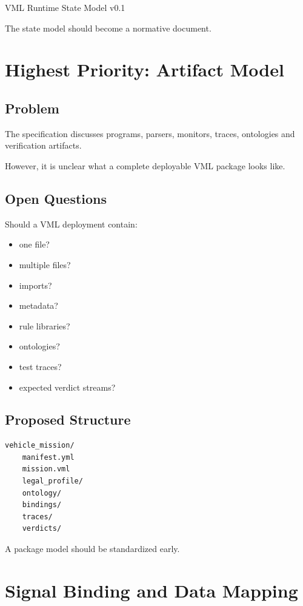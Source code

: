 \documentclass[a4paper,11pt]{article}
\begin{document}
VML Runtime State Model v0.1

The state model should become a normative document.

\section{Highest Priority: Artifact Model}

\subsection{Problem}

The specification discusses programs,
parsers,
monitors,
traces,
ontologies
and verification artifacts.

However,
it is unclear what a complete deployable VML package looks like.

\subsection{Open Questions}

Should a VML deployment contain:

\begin{itemize}
\item one file?
\item multiple files?
\item imports?
\item metadata?
\item rule libraries?
\item ontologies?
\item test traces?
\item expected verdict streams?
\end{itemize}

\subsection{Proposed Structure}

\begin{verbatim}
vehicle_mission/
    manifest.yml
    mission.vml
    legal_profile/
    ontology/
    bindings/
    traces/
    verdicts/
\end{verbatim}

A package model should be standardized early.

\section{Signal Binding and Data Mapping}
\end{document}
